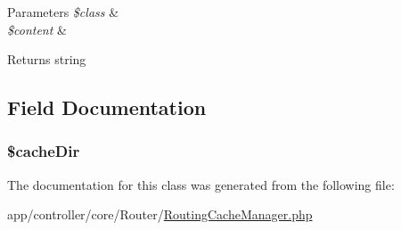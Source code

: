 \begin{DoxyParams}{Parameters}
{\em \$class} & \\
\hline
{\em \$content} & \\
\hline
\end{DoxyParams}
\begin{DoxyReturn}{Returns}
string 
\end{DoxyReturn}


\subsection{Field Documentation}
\hypertarget{class_router_1_1_routing_cache_manager_ac9d27ec635bd451cdecc1d20135f0698}{
\subsubsection[{\$cache\-Dir}]{\setlength{\rightskip}{0pt plus 5cm}\$cache\-Dir\hspace{0.3cm}{\ttfamily [protected]}}}\label{class_router_1_1_routing_cache_manager_ac9d27ec635bd451cdecc1d20135f0698}


The documentation for this class was generated from the following file\-:\begin{DoxyCompactItemize}
\item 
app/controller/core/\-Router/\hyperlink{_routing_cache_manager_8php}{Routing\-Cache\-Manager.\-php}\end{DoxyCompactItemize}

